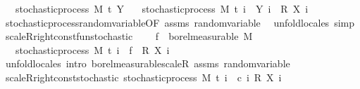 \begin{isabellebody}
\ \ \ {\isachardoublequoteopen}stochastic{\isacharunderscore}{\kern0pt}process\ M\ t\ Y{\isachardoublequoteclose}\isanewline
\ \ \ {\isachardoublequoteopen}stochastic{\isacharunderscore}{\kern0pt}process\ M\ t\ {\isacharparenleft}{\kern0pt}{\isasymlambda}i\ {\isasymxi}{\isachardot}{\kern0pt}\ {\isacharparenleft}{\kern0pt}Y\ i\ {\isasymxi}{\isacharparenright}{\kern0pt}\ {\isacharasterisk}{\kern0pt}\isactrlsub R\ {\isacharparenleft}{\kern0pt}X\ i\ {\isasymxi}{\isacharparenright}{\kern0pt}{\isacharparenright}{\kern0pt}{\isachardoublequoteclose}\isanewline
%
\isadelimproof
\ \ %
\endisadelimproof
%
\isatagproof
{}\isamarkupfalse%
\ stochastic{\isacharunderscore}{\kern0pt}process{\isachardot}{\kern0pt}random{\isacharunderscore}{\kern0pt}variable{\isacharbrackleft}{\kern0pt}OF\ assms{\isacharbrackright}{\kern0pt}\ random{\isacharunderscore}{\kern0pt}variable\ \isamarkupfalse%
\ {\isacharparenleft}{\kern0pt}unfold{\isacharunderscore}{\kern0pt}locales{\isacharparenright}{\kern0pt}\ simp%
\endisatagproof
{\isafoldproof}%
%
\isadelimproof
\isanewline
%
\endisadelimproof
\isanewline
{}\isamarkupfalse%
\ scaleR{\isacharunderscore}{\kern0pt}right{\isacharunderscore}{\kern0pt}const{\isacharunderscore}{\kern0pt}fun{\isacharunderscore}{\kern0pt}stochastic{\isacharcolon}{\kern0pt}\ \isanewline
\ \ \ {\isachardoublequoteopen}f\ {\isasymin}\ borel{\isacharunderscore}{\kern0pt}measurable\ M{\isachardoublequoteclose}\ \isanewline
\ \ \ {\isachardoublequoteopen}stochastic{\isacharunderscore}{\kern0pt}process\ M\ t\ {\isacharparenleft}{\kern0pt}{\isasymlambda}i\ {\isasymxi}{\isachardot}{\kern0pt}\ f\ {\isasymxi}\ {\isacharasterisk}{\kern0pt}\isactrlsub R\ {\isacharparenleft}{\kern0pt}X\ i\ {\isasymxi}{\isacharparenright}{\kern0pt}{\isacharparenright}{\kern0pt}{\isachardoublequoteclose}\ \isanewline
%
\isadelimproof
\ \ %
\endisadelimproof
%
\isatagproof
{}\isamarkupfalse%
\ {\isacharparenleft}{\kern0pt}unfold{\isacharunderscore}{\kern0pt}locales{\isacharparenright}{\kern0pt}\ {\isacharparenleft}{\kern0pt}intro\ borel{\isacharunderscore}{\kern0pt}measurable{\isacharunderscore}{\kern0pt}scaleR\ assms\ random{\isacharunderscore}{\kern0pt}variable{\isacharparenright}{\kern0pt}%
\endisatagproof
{\isafoldproof}%
%
\isadelimproof
\isanewline
%
\endisadelimproof
\isanewline
{}\isamarkupfalse%
\ scaleR{\isacharunderscore}{\kern0pt}right{\isacharunderscore}{\kern0pt}const{\isacharunderscore}{\kern0pt}stochastic{\isacharcolon}{\kern0pt}\ {\isachardoublequoteopen}stochastic{\isacharunderscore}{\kern0pt}process\ M\ t\ {\isacharparenleft}{\kern0pt}{\isasymlambda}i\ {\isasymxi}{\isachardot}{\kern0pt}\ c\ i\ {\isacharasterisk}{\kern0pt}\isactrlsub R\ {\isacharparenleft}{\kern0pt}X\ i\ {\isasymxi}{\isacharparenright}{\kern0pt}{\isacharparenright}{\kern0pt}{\isachardoublequoteclose}\isanewline

\end{isabellebody}
